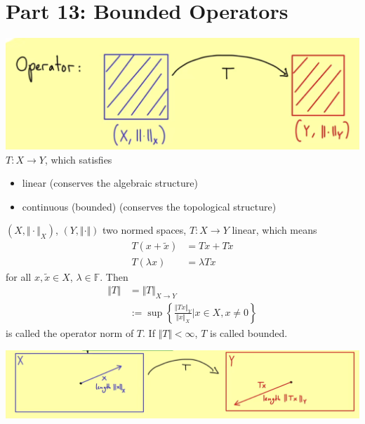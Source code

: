 \documentclass[../../note.tex]{subfiles}
\begin{document}
\section{Part 13: Bounded Operators}
\includegraphics[scale = 0.4]{../figures/operator.png}
$T: X \rightarrow Y$, which satisfies
\begin{itemize}
    \item \textrm{linear (conserves the algebraic structure)}
    \item \textrm{continuous (bounded) (conserves the topological structure)}
\end{itemize}
\begin{definition}
    $(X, \Vert \cdot \Vert_X)$, $(Y, \Vert \cdot \Vert)$ two normed spaces, $T: X \rightarrow Y$ linear, which means
    \begin{align}
        T(x+\tilde{x}) 
        &= T x + T \tilde{x} \\
        T(\lambda x)
        &= \lambda Tx
    \end{align}
    for all $x, \tilde{x} \in X$, $\lambda \in \mathbb{F}$. Then
    \begin{align}
        \Vert T \Vert 
        &= \Vert T \Vert_{X \rightarrow Y} \\
        &:= \sup\left\{\frac{\Vert Tx \Vert_Y}{\Vert x \Vert_X} \vert x \in X, x \neq 0 \right\}
    \end{align}
    is called the operator norm of $T$. If $\Vert T \Vert < \infty$, $T$ is called bounded.
\end{definition}
\includegraphics[scale = 0.3]{../figures/operator norm and bounded}
\end{document}
